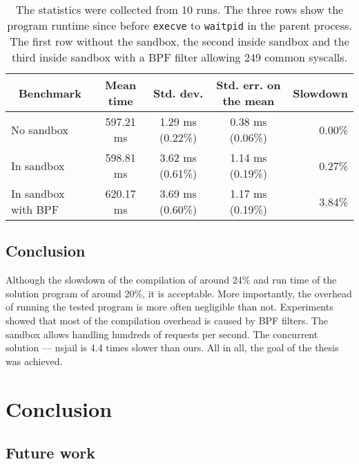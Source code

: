 \documentclass[en]{pracamgr}
\begin{document}
\begin{table}[h]
\centering
\begin{tabular}{|l|c|c|c|r|}
\hline
\multicolumn{1}{|c|}{Benchmark} & Mean time & Std. dev. & Std. err. on the mean & \multicolumn{1}{c|}{Slowdown} \\
\hline
No sandbox          & 597.21 ms & 1.29 ms (0.22\%) & 0.38 ms (0.06\%) & 0.00\% \\
In sandbox          & 598.81 ms & 3.62 ms (0.61\%) & 1.14 ms (0.19\%) & 0.27\% \\
In sandbox with BPF & 620.17 ms & 3.69 ms (0.60\%) & 1.17 ms (0.19\%) & 3.84\% \\
\hline
\end{tabular}
\caption{The statistics were collected from 10 runs. The three rows show the program runtime since before \texttt{execve} to \texttt{waitpid} in the parent process. The first row without the sandbox, the second inside sandbox and the third inside sandbox with a BPF filter allowing 249 common syscalls.}
\label{table:million_lseek}
\end{table}

\fi

\section{Conclusion}

Although the slowdown of the compilation of around 24\% and run time of the solution program of around 20\%, it is acceptable. More importantly, the overhead of running the tested program is more often negligible than not. Experiments showed that most of the compilation overhead is caused by BPF filters. The sandbox allows handling hundreds of requests per second. The concurrent solution --- nsjail is 4.4 times slower than ours. All in all, the goal of the thesis was achieved.


\chapter{Conclusion}\label{chapter:conclusion}

\section{Future work}\label{chapter:future_work}
\end{document}
